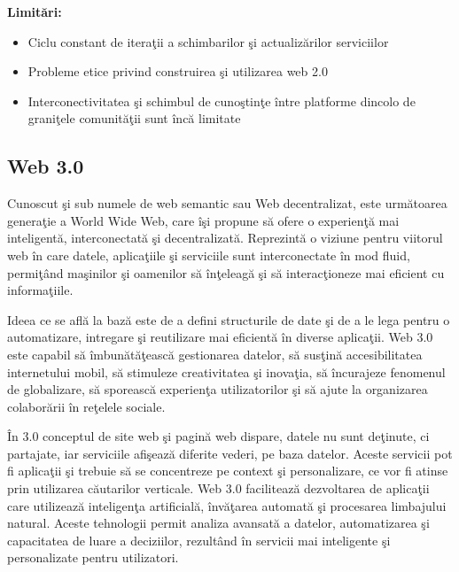 \documentclass[12pt, a4paper]{report}
\begin{document}
\textbf{Limit\u ari:}
\begin{itemize}
	\item Ciclu constant de itera\c tii a schimbarilor \c si actualiz\u arilor serviciilor
	\item Probleme etice privind construirea \c si utilizarea web 2.0
	\item Interconectivitatea \c si schimbul de cuno\c stin\c te \^intre platforme dincolo de grani\c tele comunit\u a\c tii sunt \^inc\u a limitate
\end{itemize}

\subsection{Web 3.0}

Cunoscut \c si sub numele de web semantic sau Web decentralizat, este urm\u atoarea genera\c tie a World Wide Web, care \^i\c si propune s\u a ofere o experien\c t\u a mai inteligent\u a, interconectat\u a \c si decentralizat\u a. Reprezint\u a o viziune pentru viitorul web \^in care datele, aplica\c tiile \c si serviciile sunt interconectate \^in mod fluid, permi\c t\^and ma\c sinilor \c si oamenilor s\u a \^in\c teleag\u a \c si s\u a interac\c tioneze mai eficient cu informa\c tiile.

Ideea ce se afl\u a la baz\u a este de a defini structurile de date \c si de a le lega pentru o automatizare, intregare \c si reutilizare mai eficient\u a \^in diverse aplica\c tii. Web 3.0 este capabil s\u a \^imbun\u at\u a\c teasc\u a gestionarea datelor, s\u a sus\c tin\u a accesibilitatea internetului mobil, s\u a stimuleze creativitatea \c si inova\c tia, s\u a \^incurajeze fenomenul de globalizare, s\u a sporeasc\u a experien\c ta utilizatorilor \c si s\u a ajute la organizarea colabor\u arii \^in re\c telele sociale. \cite{semantic-web}

\^In 3.0 conceptul de site web \c si pagin\u a web dispare, datele nu sunt de\c tinute, ci partajate, iar serviciile afi\c seaz\u a diferite vederi, pe baza datelor. Aceste servicii pot fi aplica\c tii \c si trebuie s\u a se concentreze pe context \c si personalizare, ce vor fi atinse prin utilizarea c\u autarilor verticale. Web 3.0 faciliteaz\u a dezvoltarea de aplica\c tii care utilizeaz\u a inteligen\c ta artificial\u a, \^inv\u a\c tarea automat\u a \c si procesarea limbajului natural. Aceste tehnologii permit analiza avansat\u a a datelor, automatizarea \c si capacitatea de luare a deciziilor, rezult\^and \^in servicii mai inteligente \c si personalizate pentru utilizatori.
\end{document}
